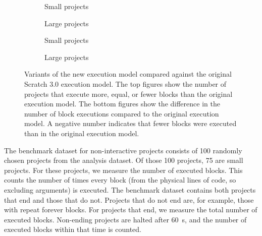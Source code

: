 \documentclass[../main]{subfiles}
\begin{document}
\begin{figure}
    \begin{wide}
        \begin{subfigure}{\linewidth}
            \centering
            
        \end{subfigure}
        \begin{subfigure}{0.49\linewidth}
            
            \caption{Small projects}
            \label{fig:blocks-non-interactive-small}
        \end{subfigure}
        \begin{subfigure}{0.49\linewidth}
            
            \caption{Large projects}
            \label{fig:blocks-non-interactive-large}
        \end{subfigure}
        \par\bigskip
        \begin{subfigure}{0.49\linewidth}
            
            \caption{Small projects}
            \label{fig:blocks-non-interactive-violin-small}
        \end{subfigure}
        \begin{subfigure}{0.49\linewidth}
            
            \caption{Large projects}
            \label{fig:blocks-non-interactive-violin-large}
        \end{subfigure}
    \end{wide}
    \caption{
        Variants of the new execution model compared against the original Scratch 3.0 execution model.
        The top figures show the number of projects that execute more, equal, or fewer blocks than the original execution model.
        The bottom figures show the difference in the number of block executions compared to the original execution model.
        A negative number indicates that fewer blocks were executed than in the original execution model.
    }
    \label{fig:blocks-non-interactive}
\end{figure}

The benchmark dataset for non-interactive projects consists of 100 randomly chosen projects from the analysis dataset.
Of those 100 projects, 75 are small projects.
For these projects, we measure the number of executed blocks.
This counts the number of times every block (from the physical lines of code, so excluding arguments) is executed.
The benchmark dataset contains both projects that end and those that do not.
Projects that do not end are, for example, those with repeat forever blocks.
For projects that end, we measure the total number of executed blocks.
Non-ending projects are halted after \qty{60}{\second}, and the number of executed blocks within that time is counted.
\end{document}
